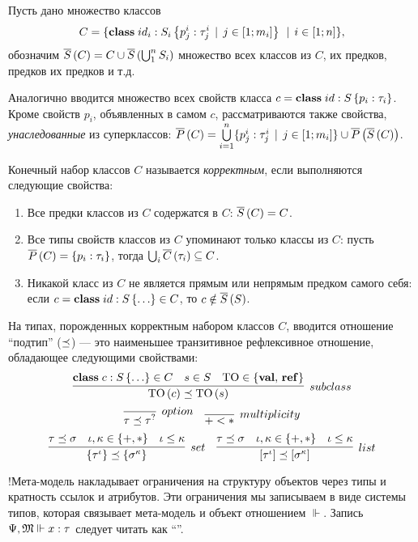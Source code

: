 Пусть дано множество классов 
$$
C = \{\mathbf{class }\;id_i : S_i \left\{p^i_j : \tau^i_j \;\,|\;\, j \in [1;m_i]\right\}\;\,|\;\, i \in [1;n]\},
$$
обозначим $\overline{S}\left(C\right) = C \cup \overline{S}\left(\bigcup_1^n S_i\right)$ множество всех классов из $C$, их предков, предков их предков и т.д.

Аналогично вводится множество всех свойств класса $c = \mathbf{class }\;id : S \left\{p_i : \tau_i\right\}$. Кроме свойств $p_i$, объявленных в самом $c$, рассматриваются также свойства, \emph{унаследованные} из суперклассов:  $\overline{P}\left(C\right) = \bigcup\limits_{i = 1}^n\{p^i_j : \tau^i_j \;\,|\;\, j \in [1;m_i]\} \cup \overline{P}\left(\overline{S}\left(C\right)\right)$.

\begin{Def}
Конечный набор классов $C$ называется \emph{корректным}, если выполняются следующие свойства:
\begin{enumerate}
\item Все предки классов из $C$ содержатся в $C$: $\overline{S}\left(C\right) = C$.
\item Все типы свойств классов из $C$ упоминают только классы из $C$: пусть $\overline{P}\left(C\right) = \left\{p_i : \tau_i\right\}$, тогда $\bigcup_i \overline{C}\left(\tau_i\right) \subseteq C$.
\item Никакой класс из $C$ не является прямым или непрямым предком самого себя: если $c = \mathbf{class }\;id : S \left\{\ldots\right\} \in C$, то $c \notin \overline{S}\left(S\right)$.
\end{enumerate}
\end{Def}

На типах, порожденных корректным набором классов $C$, вводится отношение ``подтип'' ($\preceq$) --- это наименьшее транзитивное рефлексивное отношение, обладающее следующими свойствами:
$$
\infer[subclass]{
\type{\mbox{TO}}{c} \subtype \type{\mbox{TO}}{s}
}{
	\Class{c}{S}{\ldots} \in C &
	s \in S & 
	\mbox{TO} \in \{\valts,\, \refts\}
}
$$  $$
\infer[option]{
	\tau \subtype \NullableT{\tau}
}{}
\quad
\infer[multiplicity]{
+ < *
}{}
$$ $$
\infer[set]{
	\SetT{\tau^\iota} \subtype \SetT{\sigma^\kappa}
}{
	\tau \subtype \sigma &
	\iota, \kappa \in \{+, *\} &
	\iota \le \kappa
}
\quad
\infer[list]{
	\ListT{\tau^\iota} \subtype \ListT{\sigma^\kappa}
}{
	\tau \subtype \sigma &
	\iota, \kappa \in \{+, *\} &
	\iota \le \kappa
}
$$

!Мета-модель накладывает ограничения на структуру объектов через типы и кратность ссылок и атрибутов. Эти ограничения мы записываем в виде системы типов, которая связывает мета-модель и объект отношением $\Vdash$. Запись $\Psi, \mathfrak{M} \Vdash x : \tau$ следует читать как ``''.

